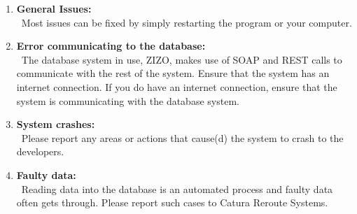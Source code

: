 \documentclass[a4paper,10pt]{article}
\begin{document}
	\begin{enumerate}
		\item \textbf{General Issues:}\\\
			Most issues can be fixed by simply restarting the program or your computer. 
		\item \textbf{Error communicating to the database:}\\\
			The database system in use, ZIZO, makes use of SOAP and REST calls to communicate with the rest of the system. Ensure that the system has an internet connection. If you do have an internet connection, ensure that the system is communicating with the database system. 
		\item \textbf{System crashes:}\\\
			Please report any areas or actions that cause(d) the system to crash to the developers.
		\item \textbf{Faulty data:}\\\
			Reading data into the database is an automated process and faulty data often gets through. Please report such cases to Catura Reroute Systems.
	\end{enumerate}
	
\end{document}

